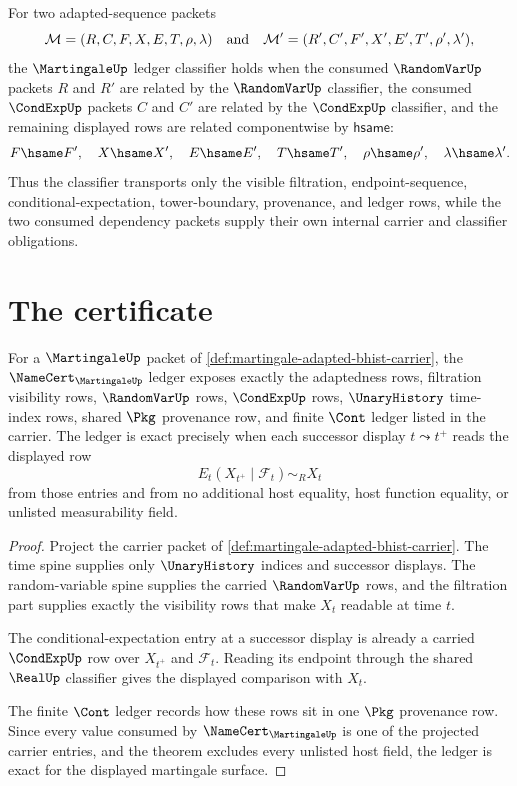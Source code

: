 \begin{definition}
\label{def:martingale-conditional-expectation-ledger-classifier}
For two adapted-sequence packets
$$
\mathcal{M}=(R,C,F,X,E,T,\rho,\lambda)
\quad\hbox{and}\quad
\mathcal{M}'=(R',C',F',X',E',T',\rho',\lambda'),
$$
the $\MartingaleUp$ ledger classifier holds when the consumed $\RandomVarUp$ packets $R$ and $R'$ are related by the $\RandomVarUp$ classifier, the consumed $\CondExpUp$ packets $C$ and $C'$ are related by the $\CondExpUp$ classifier, and the remaining displayed rows are related componentwise by $\mathsf{hsame}$:
$$
F\hsame F',
\quad
X\hsame X',
\quad
E\hsame E',
\quad
T\hsame T',
\quad
\rho\hsame \rho',
\quad
\lambda\hsame \lambda'.
$$
Thus the classifier transports only the visible filtration, endpoint-sequence, conditional-expectation, tower-boundary, provenance, and ledger rows, while the two consumed dependency packets supply their own internal carrier and classifier obligations.
\end{definition}

\section{The certificate}
\label{sec:martingale-certificate}

\begin{theorem}
\label{thm:martingale-filtration-ledger-exactness}
For a $\MartingaleUp$ packet of \autoref{def:martingale-adapted-bhist-carrier}, the $\NameCert_{\MartingaleUp}$ ledger exposes exactly the adaptedness rows, filtration visibility rows, $\RandomVarUp$ rows, $\CondExpUp$ rows, $\UnaryHistory$ time-index rows, shared $\Pkg$ provenance row, and finite $\Cont$ ledger listed in the carrier. The ledger is exact precisely when each successor display $t\leadsto t^+$ reads the displayed row
$$
E_t(X_{t^+}\mid\mathcal{F}_t)\sim_R X_t
$$
from those entries and from no additional host equality, host function equality, or unlisted measurability field.
\end{theorem}
\begin{proof}
Project the carrier packet of \autoref{def:martingale-adapted-bhist-carrier}. The time spine supplies only $\UnaryHistory$ indices and successor displays. The random-variable spine supplies the carried $\RandomVarUp$ rows, and the filtration part supplies exactly the visibility rows that make $X_t$ readable at time $t$.

The conditional-expectation entry at a successor display is already a carried $\CondExpUp$ row over $X_{t^+}$ and $\mathcal{F}_t$. Reading its endpoint through the shared $\RealUp$ classifier gives the displayed comparison with $X_t$.

The finite $\Cont$ ledger records how these rows sit in one $\Pkg$ provenance row. Since every value consumed by $\NameCert_{\MartingaleUp}$ is one of the projected carrier entries, and the theorem excludes every unlisted host field, the ledger is exact for the displayed martingale surface.
\end{proof}

